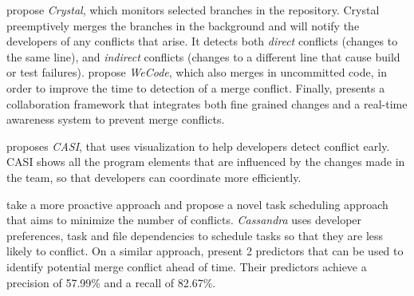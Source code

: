 \citet{Brun2011} propose \emph{Crystal}, which monitors selected branches in the repository. 
Crystal preemptively merges the branches in the background and will notify the developers of any conflicts that arise. 
It detects both \emph{direct} conflicts (changes to the same line), and \emph{indirect} conflicts (changes to a different line that cause build or test failures).
\citet{Guimaraes} propose \emph{WeCode}, which also merges in uncommitted code, in order to improve the time to detection of a merge conflict.
Finally, \citet{estler_unifying_2013} presents a collaboration framework that integrates both fine grained changes and a real-time awareness system to prevent merge conflicts.

\citet{servant_casi:_2010} proposes \emph{CASI}, that uses visualization to help developers detect conflict early.
CASI shows all the program elements that are influenced by the changes made in the team, so that developers can coordinate more efficiently.

\citet{kasi_cassandra:_2013} take a more proactive approach and propose a novel task scheduling approach that aims to minimize the number of conflicts. 
\emph{Cassandra} uses developer preferences, task and file dependencies to schedule tasks so that they are less likely to conflict.
On a similar approach, \citet{accioly_analyzing_2018} present 2 predictors that can be used to identify potential merge conflict ahead of time.
Their predictors achieve a precision of 57.99\% and a recall of 82.67\%.
